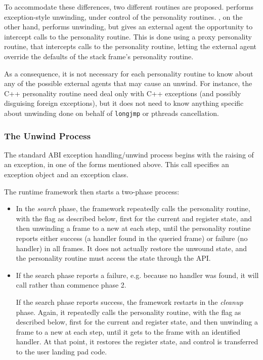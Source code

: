 To accommodate these differences, two different routines are proposed.
 performs exception-style unwinding,
under control of the personality routines. ,
on the other hand, performs unwinding, but gives an external agent the
opportunity to intercept calls to the personality routine. This is done using
a proxy personality routine, that intercepts calls to the personality routine,
letting the external agent override the defaults of the stack frame's 
personality routine.

As a consequence, it is not necessary for each personality routine to know 
about any of the possible external agents that may cause an unwind. For 
instance, the C++ personality routine need deal only with C++ exceptions
(and possibly disguising foreign exceptions), but it does not need to know
anything specific about unwinding done on behalf of \texttt{longjmp} or
pthreads cancellation.

\subsubsection{The Unwind Process}

The standard ABI exception handling/unwind process begins with the raising
of an exception, in one of the forms mentioned above. This call specifies an
exception object and an exception class.

The runtime framework then starts a two-phase process:
\begin{itemize}
\item In the \emph{search} phase, the framework repeatedly calls the
personality routine, with the  flag as
described below, first for the current \RIP and register state, and then
unwinding a frame to a new \RIP at each step, until the personality
routine reports either success (a handler found in the queried frame)
or failure (no handler) in all frames. It does not actually restore the
unwound state, and the personality routine must access the state through
the API.

\item If the search phase reports a failure, e.g. because no handler was
found, it will call  rather than commence phase 2.

If the search phase reports success, the framework restarts in the 
\emph{cleanup} phase. Again, it repeatedly calls the personality
routine, with the  flag as described
below, first for the current \RIP and register state, and then unwinding
a frame to a new \RIP at each step, until it gets to the frame with 
an identified handler. At that point, it restores the register state,
and control is transferred to the user landing pad code.
\end {itemize}

